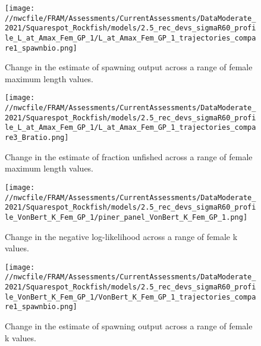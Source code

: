 \documentclass[11pt,
  english,
  a4paper,
]{article}
\begin{document}
\tagmcend\tagstructend


\begin{figure}
\centering
\texttt{[image: //nwcfile/FRAM/Assessments/CurrentAssessments/DataModerate\_2021/Squarespot\_Rockfish/models/2.5\_rec\_devs\_sigmaR60\_profile\_L\_at\_Amax\_Fem\_GP\_1/L\_at\_Amax\_Fem\_GP\_1\_trajectories\_compare1\_spawnbio.png]}
\caption{Change in the estimate of spawning output across a range of female maximum length values.\label{fig:linf-ssb}}
\end{figure}

\tagmcend\tagstructend


\begin{figure}
\centering
\texttt{[image: //nwcfile/FRAM/Assessments/CurrentAssessments/DataModerate\_2021/Squarespot\_Rockfish/models/2.5\_rec\_devs\_sigmaR60\_profile\_L\_at\_Amax\_Fem\_GP\_1/L\_at\_Amax\_Fem\_GP\_1\_trajectories\_compare3\_Bratio.png]}
\caption{Change in the estimate of fraction unfished across a range of female maximum length values.\label{fig:linf-depl}}
\end{figure}

\tagmcend\tagstructend


\begin{figure}
\centering
\texttt{[image: //nwcfile/FRAM/Assessments/CurrentAssessments/DataModerate\_2021/Squarespot\_Rockfish/models/2.5\_rec\_devs\_sigmaR60\_profile\_VonBert\_K\_Fem\_GP\_1/piner\_panel\_VonBert\_K\_Fem\_GP\_1.png]}
\caption{Change in the negative log-likelihood across a range of female k values.\label{fig:k-profile}}
\end{figure}

\tagmcend\tagstructend


\begin{figure}
\centering
\texttt{[image: //nwcfile/FRAM/Assessments/CurrentAssessments/DataModerate\_2021/Squarespot\_Rockfish/models/2.5\_rec\_devs\_sigmaR60\_profile\_VonBert\_K\_Fem\_GP\_1/VonBert\_K\_Fem\_GP\_1\_trajectories\_compare1\_spawnbio.png]}
\caption{Change in the estimate of spawning output across a range of female k values.\label{fig:k-ssb}}
\end{figure}
\end{document}
